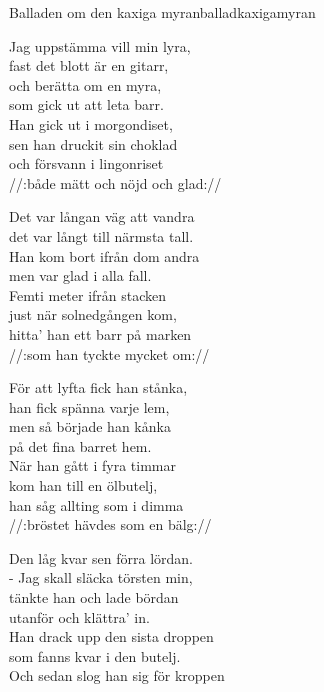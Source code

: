 \begin{song}{Balladen om den kaxiga myran}{balladkaxigamyran}
\begin{vers}
Jag uppstämma vill min lyra,\\
fast det blott är en gitarr,\\
och berätta om en myra,\\
som gick ut att leta barr.\\
Han gick ut i morgondiset,\\
sen han druckit sin choklad\\
och försvann i lingonriset\\
//:både mätt och nöjd och glad://\\
\end{vers}
\begin{vers}
Det var långan väg att vandra\\
det var långt till närmsta tall.\\
Han kom bort ifrån dom andra\\
men var glad i alla fall.\\
Femti meter ifrån stacken\\
just när solnedgången kom,\\
hitta' han ett barr på marken\\
//:som han tyckte mycket om://\\
\end{vers}
\begin{vers}
För att lyfta fick han stånka,\\
han fick spänna varje lem,\\
men så började han kånka\\
på det fina barret hem.\\
När han gått i fyra timmar\\
kom han till en ölbutelj,\\
han såg allting som i dimma\\
//:bröstet hävdes som en bälg://\\
\end{vers}
\begin{vers}
Den låg kvar sen förra lördan.\\
- Jag skall släcka törsten min,\\
tänkte han och lade bördan\\
utanför och klättra' in.\\
Han drack upp den sista droppen\\
som fanns kvar i den butelj.\\
Och sedan slog han sig för kroppen\\

\end{vers}
\end{song}
